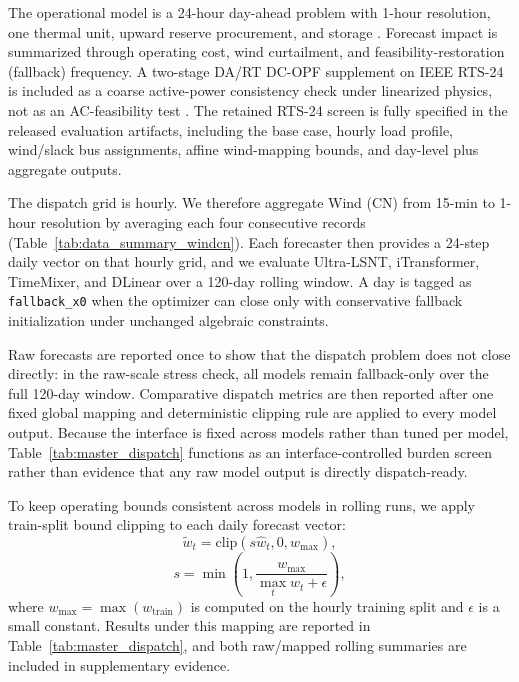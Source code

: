 \documentclass[review,1p,times]{elsarticle}
\begin{document}
The operational model is a 24-hour day-ahead problem with 1-hour resolution, one thermal unit, upward reserve procurement, and storage \cite{botterud2011operational,yan2025economicvalue,dlt5002_2021}. Forecast impact is summarized through operating cost, wind curtailment, and feasibility-restoration (fallback) frequency. A two-stage DA/RT DC-OPF supplement on IEEE RTS-24 is included as a coarse active-power consistency check under linearized physics, not as an AC-feasibility test \cite{larrahondo2021acdcomp}. The retained RTS-24 screen is fully specified in the released evaluation artifacts, including the base case, hourly load profile, wind/slack bus assignments, affine wind-mapping bounds, and day-level plus aggregate outputs.

The dispatch grid is hourly. We therefore aggregate Wind (CN) from 15-min to 1-hour resolution by averaging each four consecutive records (Table~\ref{tab:data_summary_windcn}). Each forecaster then provides a 24-step daily vector on that hourly grid, and we evaluate Ultra-LSNT, iTransformer, TimeMixer, and DLinear over a 120-day rolling window. A day is tagged as \texttt{fallback\_x0} when the optimizer can close only with conservative fallback initialization under unchanged algebraic constraints.

Raw forecasts are reported once to show that the dispatch problem does not close directly: in the raw-scale stress check, all models remain fallback-only over the full 120-day window. Comparative dispatch metrics are then reported after one fixed global mapping and deterministic clipping rule are applied to every model output. Because the interface is fixed across models rather than tuned per model, Table~\ref{tab:master_dispatch} functions as an interface-controlled burden screen rather than evidence that any raw model output is directly dispatch-ready.

To keep operating bounds consistent across models in rolling runs, we apply train-split bound clipping to each daily forecast vector:
\begin{equation}
\tilde{w}_t=\mathrm{clip}(s\hat{w}_t,0,w_{\max}),
\label{eq:dispatch_feas_map}
\end{equation}
\begin{equation}
s=\min\left(1,\frac{w_{\max}}{\max_t \hat{w}_t + \epsilon}\right),
\end{equation}
where $w_{\max}=\max(w_{\text{train}})$ is computed on the hourly training split and $\epsilon$ is a small constant. Results under this mapping are reported in Table~\ref{tab:master_dispatch}, and both raw/mapped rolling summaries are included in supplementary evidence.
\end{document}

